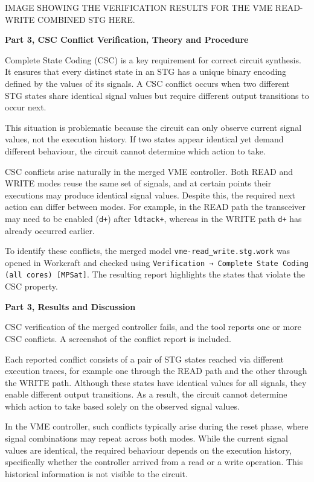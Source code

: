 \documentclass[a4paper,12pt]{article}
\begin{document}
\begin{large}
    IMAGE SHOWING THE VERIFICATION RESULTS FOR THE VME READ-WRITE COMBINED STG HERE.
\end{large}

\textbf{Part 3, CSC Conflict Verification, Theory and Procedure}

Complete State Coding (CSC) is a key requirement for correct circuit synthesis. It ensures that every distinct state in an STG has a unique binary encoding defined by the values of its signals. A CSC conflict occurs when two different STG states share identical signal values but require different output transitions to occur next.

This situation is problematic because the circuit can only observe current signal values, not the execution history. If two states appear identical yet demand different behaviour, the circuit cannot determine which action to take.

CSC conflicts arise naturally in the merged VME controller. Both READ and WRITE modes reuse the same set of signals, and at certain points their executions may produce identical signal values. Despite this, the required next action can differ between modes. For example, in the READ path the transceiver may need to be enabled (\texttt{d+}) after \texttt{ldtack+}, whereas in the WRITE path \texttt{d+} has already occurred earlier.

To identify these conflicts, the merged model \texttt{vme-read\_write.stg.work} was opened in Workcraft and checked using \texttt{Verification → Complete State Coding (all cores) [MPSat]}. The resulting report highlights the states that violate the CSC property.

\textbf{Part 3, Results and Discussion}

CSC verification of the merged controller fails, and the tool reports one or more CSC conflicts. A screenshot of the conflict report is included.

Each reported conflict consists of a pair of STG states reached via different execution traces, for example one through the READ path and the other through the WRITE path. Although these states have identical values for all signals, they enable different output transitions. As a result, the circuit cannot determine which action to take based solely on the observed signal values.

In the VME controller, such conflicts typically arise during the reset phase, where signal combinations may repeat across both modes. While the current signal values are identical, the required behaviour depends on the execution history, specifically whether the controller arrived from a read or a write operation. This historical information is not visible to the circuit.
\end{document}
